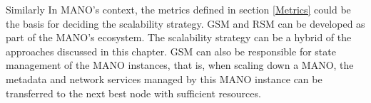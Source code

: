 Similarly In MANO's context, the metrics defined in section \ref{Metrics} could be the basis for deciding the scalability strategy. GSM and RSM can be developed as part of the MANO's ecosystem. The scalability strategy can be a hybrid of the approaches discussed in this chapter.
GSM can also be responsible for state management of the MANO instances, that is, when scaling down a MANO, the metadata and network services managed by this MANO instance can be transferred to the next best node with sufficient resources.  

